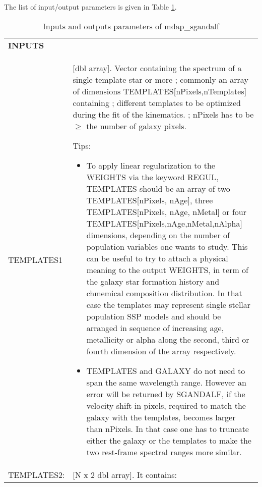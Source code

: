 The list of input/output parameters is given in Table
\ref{dap_tab:mdap_sgandalf}.


\begin{center}
\begin{longtable}{p{2.7cm}| p{11.1cm}}
\caption{Inputs and outputs parameters of mdap\_sgandalf} \label{dap_tab:mdap_sgandalf} \\
\hline
\endfirsthead
\hline
\endhead
\hline
\endlastfoot
\hline
{\bf  INPUTS} & \\
TEMPLATES1 & [dbl array].  Vector containing the spectrum of a single template star or
        more ; commonly an array of dimensions
        TEMPLATES[nPixels,nTemplates] containing ; different templates
        to be optimized during the fit of the kinematics.  ; nPixels
        has to be $\geq$ the number of galaxy pixels.  

         Tips:
           \begin{itemize}

   \item To apply linear regularization to the WEIGHTS via the
     keyword REGUL, TEMPLATES should be an array of two
     TEMPLATES[nPixels, nAge], three TEMPLATES[nPixels, nAge, nMetal]
     or four TEMPLATES[nPixels,nAge,nMetal,nAlpha] dimensions,
     depending on the number of population variables one wants to
     study.  This can be useful to try to attach a physical meaning
     to the output WEIGHTS, in term of the galaxy star formation
     history and chmemical composition distribution.  In that case
     the templates may represent single stellar population SSP
     models and should be arranged in sequence of increasing age,
     metallicity or alpha along the second, third or fourth
     dimension of the array respectively.

   \item TEMPLATES and GALAXY do not need to span the same
     wavelength range. However an error will be returned by
     SGANDALF, if the velocity shift in pixels, required to match
     the galaxy with the templates, becomes larger than nPixels. In
     that case one has to truncate either the galaxy or the
     templates to make the two rest-frame spectral ranges more
     similar.

      \end{itemize} \\
%
TEMPLATES2: &[N x 2  dbl array]. It contains:


\end{longtable}
\end{center}
